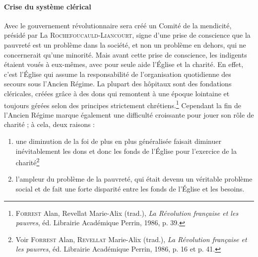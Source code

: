 \documentclass[a4paper,11pt,]{scrartcl}
\begin{document}
\paragraph{Crise du système clérical}
Avec le gouvernement révolutionnaire sera créé un Comité de la mendicité, présidé par La \textsc{Rochefoucauld-Liancourt}, signe d'une prise de conscience que la pauvreté est un problème dans la société, et non un problème en dehors, qui ne concernerait qu'une minorité. Mais avant cette prise de conscience, les indigents étaient voués à eux-mêmes, avec pour seule aide l'Église et la charité. En effet, \og c'est l'Église qui assume la responsabilité de l'organisation quotidienne des secours sous l'Ancien Régime. La plupart des hôpitaux sont des fondations cléricales, créées grâce à des dons qui remontent à une époque lointaine et toujours gérées selon des principes strictement chrétiens.\fg\footnote{\textsc{Forrest} Alan, Revellat Marie-Alix (trad.), \emph{La Révolution française et les pauvres}, éd. Librairie Académique Perrin, 1986, p. 39.} Cependant la fin de l'Ancien Régime marque également une difficulté croissante pour jouer son rôle de charité ; à cela, deux raisons :
\begin{enumerate}
 \item une diminution de la foi de plus en plus généralisée faisait diminuer inévitablement les dons et donc les fonds de l'Église pour l'exercice de la charité\footnote{Voir \textsc{Forrest} Alan, \textsc{Revellat} Marie-Alix (trad.), \emph{La Révolution française et les pauvres}, éd. Librairie Académique Perrin, 1986, p. 16 et p. 41.}
 \item l'ampleur du problème de la pauvreté, qui était devenu un véritable problème social et de fait une forte disparité entre les fonds de l'Église et les besoins.
\end{enumerate}
\end{document}
